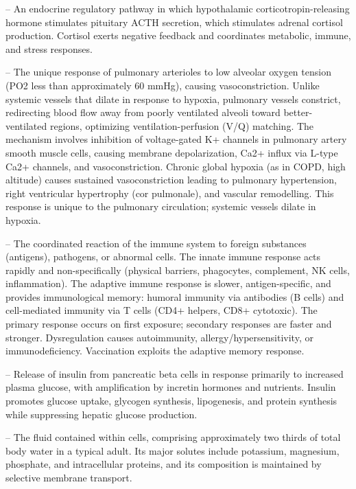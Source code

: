 -- An endocrine regulatory pathway in which hypothalamic corticotropin-releasing hormone stimulates pituitary ACTH secretion, which stimulates adrenal cortisol production. Cortisol exerts negative feedback and coordinates metabolic, immune, and stress responses.

-- The unique response of pulmonary arterioles to low alveolar oxygen tension (PO2 less than approximately 60 mmHg), causing vasoconstriction. Unlike systemic vessels that dilate in response to hypoxia, pulmonary vessels constrict, redirecting blood flow away from poorly ventilated alveoli toward better-ventilated regions, optimizing ventilation-perfusion (V/Q) matching. The mechanism involves inhibition of voltage-gated K+ channels in pulmonary artery smooth muscle cells, causing membrane depolarization, Ca2+ influx via L-type Ca2+ channels, and vasoconstriction. Chronic global hypoxia (as in COPD, high altitude) causes sustained vasoconstriction leading to pulmonary hypertension, right ventricular hypertrophy (cor pulmonale), and vascular remodelling. This response is unique to the pulmonary circulation; systemic vessels dilate in hypoxia.

-- The coordinated reaction of the immune system to foreign substances (antigens), pathogens, or abnormal cells. The innate immune response acts rapidly and non-specifically (physical barriers, phagocytes, complement, NK cells, inflammation). The adaptive immune response is slower, antigen-specific, and provides immunological memory: humoral immunity via antibodies (B cells) and cell-mediated immunity via T cells (CD4+ helpers, CD8+ cytotoxic). The primary response occurs on first exposure; secondary responses are faster and stronger. Dysregulation causes autoimmunity, allergy/hypersensitivity, or immunodeficiency. Vaccination exploits the adaptive memory response.

-- Release of insulin from pancreatic beta cells in response primarily to increased plasma glucose, with amplification by incretin hormones and nutrients. Insulin promotes glucose uptake, glycogen synthesis, lipogenesis, and protein synthesis while suppressing hepatic glucose production.

-- The fluid contained within cells, comprising approximately two thirds of total body water in a typical adult. Its major solutes include potassium, magnesium, phosphate, and intracellular proteins, and its composition is maintained by selective membrane transport.

